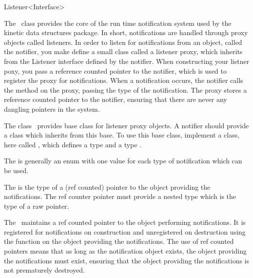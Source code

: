 

\begin{ccRefClass}{Listener<Interface>}  %


\ccDefinition
 
The \ccRefName\ class provides the core of the run time notification
system used by the kinetic data structures package. In short,
notifications are handled through proxy objects called listeners. In
order to listen for notifications from an object, called the notifier,
you make define a small class called a listener proxy, which inherits
from the Listener interface defined by the notifier. When constructing
your listner poxy, you pass a reference counted pointer to the
notifier, which is used to register the proxy for notifications. When
a notification occurs, the notifier calls the 
method on the proxy, passing the type of the notification. The proxy
stores a reference counted pointer to the notifier, ensuring that
there are never any dangling pointers in the system.

The class \ccRefName\ provides base class for listener proxy objects.
A notifier should provide a class which inherits from this base. To
use this base class, implement a class, here called ,
which defines a type  and a type
.

The  is generally an enum with one value for
each type of notification which can be used.

The  is the type of a (ref counted) pointer to
the object providing the notifications. The ref counter pointer must
provide a nested type  which is the type of a raw
pointer.

The \ccRefName\ maintains a ref counted pointer to the object
performing notifications. It is registered for notifications on
construction and unregistered on destruction using the function
 on the object providing the
notifications. The use of ref counted pointers means that as long as
the notification object exists, the object providing the notifications
must exist, ensuring that the object providing the notifications is
not prematurely destroyed.


\end{ccRefClass}
